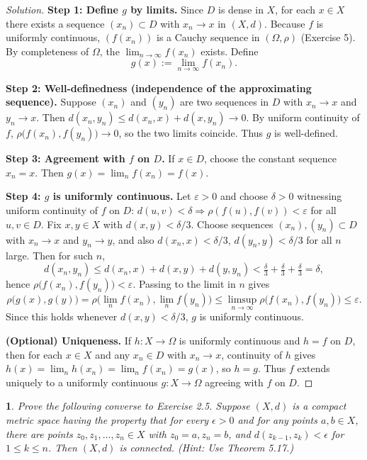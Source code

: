\documentclass[12pt, a4paper]{report}
\theoremstyle{spaced}
\newtheorem{exercise}{}
\newcommand{\setexercise}[1]{\setcounter{exercise}{#1-1}}
\begin{document}
\begin{proof}[Solution]
	\textbf{Step 1: Define $g$ by limits.}
	Since $D$ is dense in $X$, for each $x\in X$ there exists a sequence $(x_n)\subset D$
	with $x_n\to x$ in $(X,d)$. Because $f$ is uniformly continuous,
	$(f(x_n))$ is a Cauchy sequence in $(\Omega,\rho)$ (Exercise 5).
	By completeness of $\Omega$, the $\lim_{n\to\infty} f(x_n)$ exists.
	Define
	\[
		g(x):=\lim_{n\to\infty} f(x_n).
	\]

	\textbf{Step 2: Well-definedness (independence of the approximating sequence).}
	Suppose $(x_n)$ and $(y_n)$ are two sequences in $D$ with $x_n\to x$ and $y_n\to x$.
	Then $d(x_n,y_n)\le d(x_n,x)+d(x,y_n)\to 0$.
	By uniform continuity of $f$, $\rho\bigl(f(x_n),f(y_n)\bigr)\to 0$,
	so the two limits coincide. Thus $g$ is well-defined.

	\medskip

	\textbf{Step 3: Agreement with $f$ on $D$.}
	If $x\in D$, choose the constant sequence $x_n=x$. Then
	$g(x)=\lim_n f(x_n)=f(x)$.

	\medskip

	\textbf{Step 4: $g$ is uniformly continuous.}
	Let $\varepsilon>0$ and choose $\delta>0$ witnessing uniform continuity of $f$ on $D$:
	$d(u,v)<\delta \Rightarrow \rho(f(u),f(v))<\varepsilon$ for all $u,v\in D$.
	Fix $x,y\in X$ with $d(x,y)<\delta/3$. Choose sequences $(x_n),(y_n)\subset D$
	with $x_n\to x$ and $y_n\to y$, and also $d(x_n,x)<\delta/3$, $d(y_n,y)<\delta/3$ for all $n$ large.
	Then for such $n$,
	\[
		d(x_n,y_n)\le d(x_n,x)+d(x,y)+d(y,y_n)<\tfrac{\delta}{3}+\tfrac{\delta}{3}+\tfrac{\delta}{3}=\delta,
	\]
	hence $\rho\bigl(f(x_n),f(y_n)\bigr)<\varepsilon$.
	Passing to the limit in $n$ gives
	\[
		\rho\bigl(g(x),g(y)\bigr)
		=\rho\bigl(\lim_n f(x_n),\lim_n f(y_n)\bigr)
		\le \limsup_{n\to\infty}\rho\bigl(f(x_n),f(y_n)\bigr)
		\le \varepsilon.
	\]
	Since this holds whenever $d(x,y)<\delta/3$, $g$ is uniformly continuous.

	\textbf{(Optional) Uniqueness.}
	If $h:X\to\Omega$ is uniformly continuous and $h=f$ on $D$, then for each $x\in X$ and any
	$x_n\in D$ with $x_n\to x$, continuity of $h$ gives
	$h(x)=\lim_n h(x_n)=\lim_n f(x_n)=g(x)$, so $h=g$.
	Thus $f$ extends uniquely to a uniformly continuous $g:X\to\Omega$ agreeing with $f$ on $D$.
\end{proof}


\setexercise{9}
\begin{exercise}
	Prove the following converse to Exercise 2.5. Suppose $(X,d)$ is a compact metric space having the property that for every $\epsilon > 0$ and for any points $a, b \in X$, there are points $z_0, z_1, \ldots, z_n \in X$ with $z_0 = a, z_n = b$, and $d(z_{k-1}, z_k) < \epsilon$ for $1 \leq k \leq n$. Then $(X,d)$ is connected. (Hint: Use Theorem 5.17.)
\end{exercise}
\end{document}
